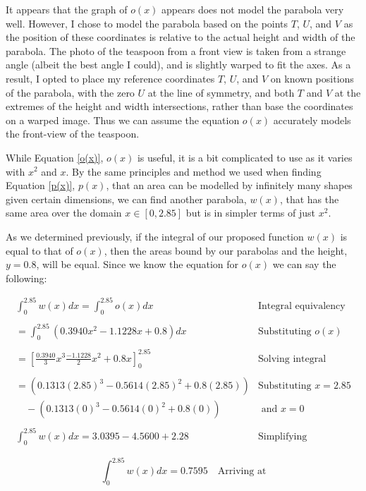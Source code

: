 \documentclass[12pt]{article}
\begin{document}
It appears that the graph of $o(x)$ appears does not model the parabola very well. However, I chose to model the parabola based on the points $T$, $U$, and $V$ as the position of these coordinates is relative to the actual height and width of the parabola. The photo of the teaspoon from a front view is taken from a strange angle (albeit the best angle I could), and is slightly warped to fit the axes. As a result, I opted to place my reference coordinates $T$, $U$, and $V$ on known positions of the parabola, with the zero $U$ at the line of symmetry, and both $T$ and $V$ at the extremes of the height and width intersections, rather than base the coordinates on a warped image. Thus we can assume the equation $o(x)$ accurately models the front-view of the teaspoon.

While Equation \ref{o(x)}, $o(x)$ is useful, it is a bit complicated to use as it varies with $x^2$ and $x$. By the same principles and method we used when finding Equation \ref{p(x)}, $p(x)$, that an area can be modelled by infinitely many shapes given certain dimensions, we can find another parabola, $w(x)$, that has the same area over the domain $x \in [0,2.85]$ but is in simpler terms of just $x^2$. 

As we determined previously, if the integral of our proposed function $w(x)$ is equal to that of $o(x)$, then the areas bound by our parabolas and the height, $y=0.8$, will be equal. Since we know the equation for $o(x)$ we can say the following:

$$
\begin{array}{l|c}
    \int_0^{2.85}{w(x)}dx = \int_{0}^{2.85}{o(x)}dx & \text{Integral equivalency} \\ \\
    = \int_{0}^{2.85}{(0.3940x^2 -1.1228 x +0.8)}dx & \text{Substituting } o(x) \\ \\
    = \left[   \frac{0.3940}{3}x^3 \frac{-1.1228}{2}x^2 + 0.8x \right]_0^{2.85} & \text{Solving integral} \\ \\
    = (0.1313(2.85)^3 -0.5614(2.85)^2 + 0.8(2.85)) & \text{Substituting } x=2.85 \\ 
    \quad - (0.1313(0)^3 -0.5614(0)^2 + 0.8(0)) & \text{ and } x=0 \\ \\
    \int_0^{2.85}{w(x)}dx = 3.0395 -4.5600 +2.28 & \text{Simplifying}
 \end{array}
$$

\begin{equation}\label{int.wx}
    \boxed{\int_0^{2.85}{w(x)}dx = 0.7595}  \quad \text{Arriving at}
\end{equation}
\end{document}
